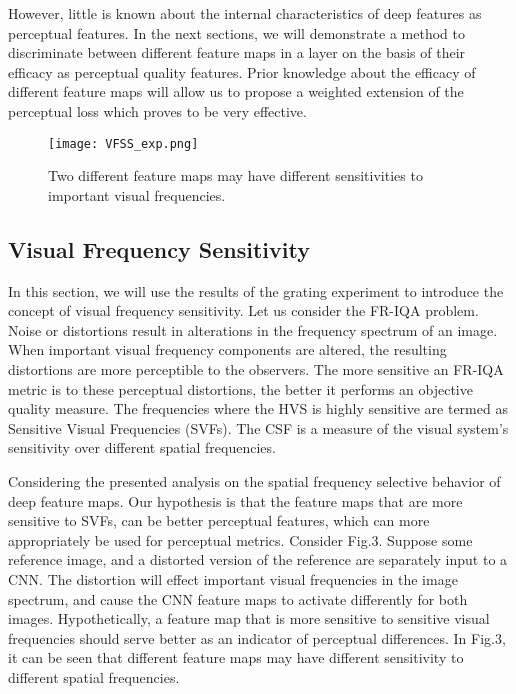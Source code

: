 \documentclass[10pt,twocolumn,letterpaper]{article}
\begin{document}
However, little is known about the internal characteristics of deep features as perceptual features. In the next sections, we will demonstrate a method to discriminate between different feature maps in a layer on the basis of their efficacy as perceptual quality features. Prior knowledge  about the efficacy of different feature maps will allow us to propose a weighted extension of the perceptual loss which proves to be very effective.

\begin{figure}[t!]
\texttt{[image: VFSS\_exp.png]}
\caption{Two different feature maps may have different sensitivities to important visual frequencies.}
\label{fig:Spike_Sorting}
\end{figure}

\subsection{Visual Frequency Sensitivity}
In this section, we will use the results of the grating experiment to introduce the concept of visual frequency sensitivity. Let us consider the FR-IQA problem. Noise or distortions result in alterations in the frequency spectrum of an image. When important visual frequency components are altered, the resulting distortions are more perceptible to the observers. The more sensitive an FR-IQA metric is to these perceptual distortions, the better it performs an objective quality measure. The frequencies where the HVS is highly sensitive are termed as Sensitive Visual Frequencies (SVFs). The CSF is a measure of the visual system's sensitivity over different spatial frequencies.

    Considering the presented analysis on the spatial frequency selective behavior of deep feature maps. Our hypothesis is that the feature maps that are more sensitive to SVFs, can be better perceptual features, which can more appropriately be used for perceptual metrics. Consider Fig.3. Suppose some reference image, and a distorted version of the reference are separately input to a CNN. The distortion will effect important visual frequencies in the image spectrum, and cause the CNN feature maps to activate differently for both images. Hypothetically, a feature map that is more sensitive to sensitive visual frequencies should serve better as an indicator of perceptual differences. In Fig.3, it can be seen that different feature maps may have different sensitivity to different spatial frequencies.
\end{document}
